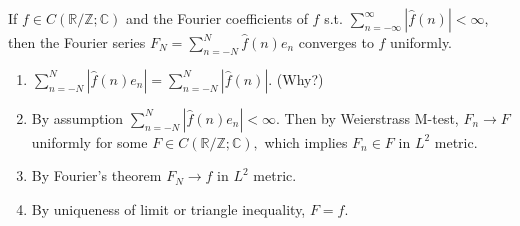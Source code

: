 \documentclass[12pt]{article}
\begin{document}
\begin{theorem}
    If $f\in  C(\mathbb{R}/\mathbb{Z}; \mathbb{C})$ and the Fourier coefficients of $f$ s.t.
    $\sum_{n=-\infty}^{\infty}\left|\hat{f}(n)\right|<\infty$, then the Fourier series $F_N = \sum_{n=-N}^{N}\hat{f}(n)e_n$ converges to $f$ uniformly.
\end{theorem}

\begin{pfbox}
\begin{enumerate}
    \item $\sum_{n=-N}^{N}\left|\hat{f}(n)e_n\right| = \sum_{n=-N}^{N}\left|\hat{f}(n)\right|$. (Why?)
    \item By assumption $\sum_{n=-N}^{N}\left|\hat{f}(n)e_n\right|<\infty$. Then by Weierstrass M-test, $F_n\rightarrow F$ uniformly for some $F\in C(\mathbb{R}/\mathbb{Z}; \mathbb{C}),$ which implies $F_n\in F$ in $L^2$ metric.
    \item By Fourier's theorem $F_N\rightarrow f$ in $L^2$ metric.    
    \item By uniqueness of limit or triangle inequality, $F=f$.
\end{enumerate}    
\end{pfbox}
\end{document}
